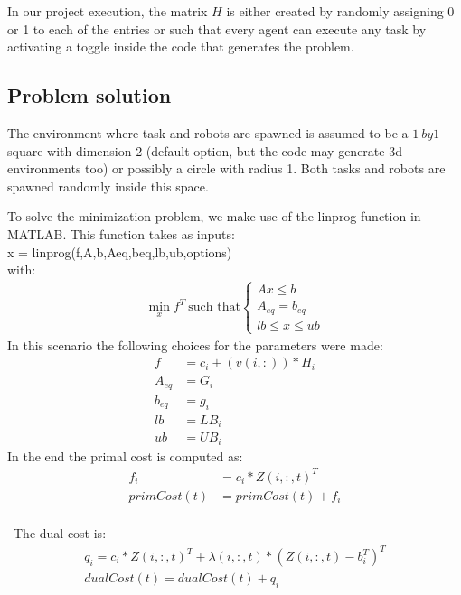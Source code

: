 \documentclass{article}
\begin{document}
In our project execution, the matrix $H$ is either created by randomly assigning 0 or 1 to each of the entries or such that every agent can execute any task by activating a toggle inside the code that generates the problem.
\subsection{Problem solution}
The environment where task and robots are spawned is assumed to be a $1\ by 1$ square with dimension 2 (default option, but the code may generate 3d environments too) or possibly a circle with radius 1. Both tasks and robots are spawned randomly inside this space.

To solve the minimization problem, we make use of the linprog function in MATLAB. This function takes as inputs: \\
x = linprog(f,A,b,Aeq,beq,lb,ub,options)\\
with:
\begin{align}
    \min_{x}f^T\ \text{such that} 
    \begin{cases} Ax \leq b\\
        A_{eq} = b_{eq}\\
        lb \leq x \leq ub
    \end{cases}
\end{align}
In this scenario the following choices for the parameters were made:
\begin{align}
    f &= c_i+(v(i,:))*H_i\\
    A_{eq} &= G_i\\
    b_{eq} &= g_i\\
    lb&= LB_i\\
    ub&= UB_i
\end{align}
In the end the primal cost is computed as:
\begin{align}
f_i &= c_i*Z(i,:,t)^T\\
primCost(t)&= primCost(t) + f_i\\     
\end{align}

\
The dual cost is:\\

\begin{align}
  q_i = c_i * Z(i,:,t)^T+\lambda(i,:,t) * ( Z(i,:,t) - b_i^T )^T\\
        dualCost(t) = dualCost(t) + q_i
\end{align}

\newpage
\end{document}
